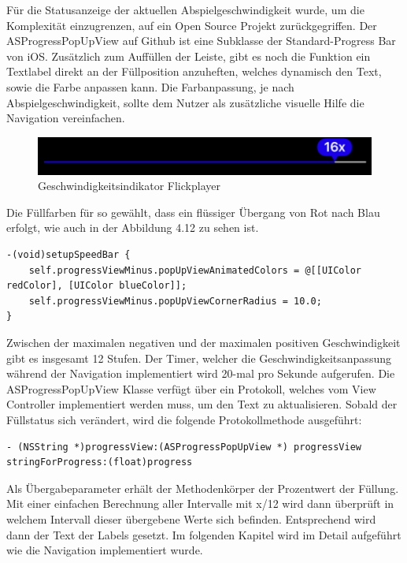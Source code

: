 \documentclass[11pt,a4paper]{report}
\begin{document}
Für die Statusanzeige der aktuellen Abspielgeschwindigkeit wurde, um die Komplexität einzugrenzen, auf ein Open Source Projekt zurückgegriffen. Der ASProgressPopUpView auf Github ist eine Subklasse der Standard-Progress Bar von iOS. Zusätzlich zum Auffüllen der Leiste, gibt es noch die Funktion ein Textlabel direkt an der Füllposition anzuheften, welches dynamisch den Text, sowie die Farbe anpassen kann. Die Farbanpassung, je nach Abspielgeschwindigkeit, sollte dem Nutzer als zusätzliche visuelle Hilfe die Navigation vereinfachen.
\begin{figure}[h]
\begin{center}
\includegraphics[scale=1]{./images/27.png}
\caption{Geschwindigkeitsindikator Flickplayer}
\label{flickplayer_indikator}
\end{center}
\end{figure}
Die Füllfarben für so gewählt, dass ein flüssiger Übergang von Rot nach Blau erfolgt, wie auch in der Abbildung 4.12 zu sehen ist.
\begin{lstlisting}
-(void)setupSpeedBar {
	self.progressViewMinus.popUpViewAnimatedColors = @[[UIColor redColor], [UIColor blueColor]];
	self.progressViewMinus.popUpViewCornerRadius = 10.0;
}
\end{lstlisting}
Zwischen der maximalen negativen und der maximalen positiven Geschwindigkeit gibt es insgesamt 12 Stufen. Der Timer, welcher die Geschwindigkeitsanpassung während der Navigation implementiert wird 20-mal pro Sekunde aufgerufen. Die ASProgressPopUpView Klasse verfügt über ein Protokoll, welches vom View Controller implementiert werden muss, um den Text zu aktualisieren. Sobald der Füllstatus sich verändert, wird die folgende Protokollmethode ausgeführt:
\begin{lstlisting}
- (NSString *)progressView:(ASProgressPopUpView *) progressView stringForProgress:(float)progress 
\end{lstlisting}
Als Übergabeparameter erhält der Methodenkörper der Prozentwert der Füllung. Mit einer einfachen Berechnung aller Intervalle mit x/12 wird dann überprüft in welchem Intervall dieser übergebene Werte sich befinden. Entsprechend wird dann der Text der Labels gesetzt. \cite{ASProgressPopUpViewRepository}
Im folgenden Kapitel wird im Detail aufgeführt wie die Navigation implementiert wurde.
\end{document}
